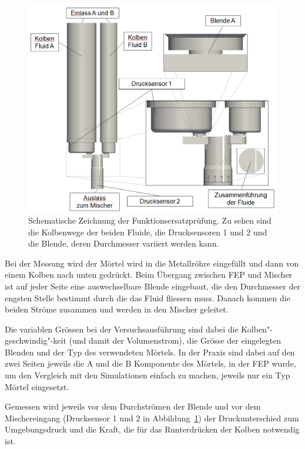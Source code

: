 %
\begin{figure}
    \centering
    \includegraphics[width=\textwidth]{figures/FEP_Schema.png}
    \caption{Schematische Zeichnung der Funktionsersatzprüfung. Zu sehen sind die Kolbenwege der beiden Fluide,
    die Drucksensoren 1 und 2 und die Blende, deren Durchmesser variiert werden kann.}
    \label{fig:FEP_schema}
\end{figure}

Bei der Messung wird der Mörtel wird in die Metallröhre eingefüllt und dann von einem Kolben nach unten gedrückt. Beim Übergang zwischen FEP und Mischer ist auf jeder Seite eine auswechselbare Blende eingebaut, die den Durchmesser der engsten Stelle bestimmt durch die das Fluid fliessen muss. Danach kommen die beiden Ströme zusammen und werden in den Mischer geleitet.

Die variablen Grössen bei der Versuchsausführung sind dabei die Kolben"-geschwindig"-keit (und damit der Volumenstrom), die Grösse der eingelegten Blenden und der Typ des verwendeten Mörtels. In der Praxis sind dabei auf den zwei Seiten jeweils die A und die B Komponente des Mörtels, in der FEP wurde, um den Vergleich mit den Simulationen einfach zu machen, jeweils nur ein Typ Mörtel eingesetzt.

Gemessen wird jeweils vor dem Durchströmen der Blende und vor dem Mischereingang (Drucksensor 1 und 2 in Abbildung~\ref{fig:FEP_schema}) der Druckunterschied zum Umgebungsdruck und die Kraft, die für das Runterdrücken der Kolben notwendig ist.
%
